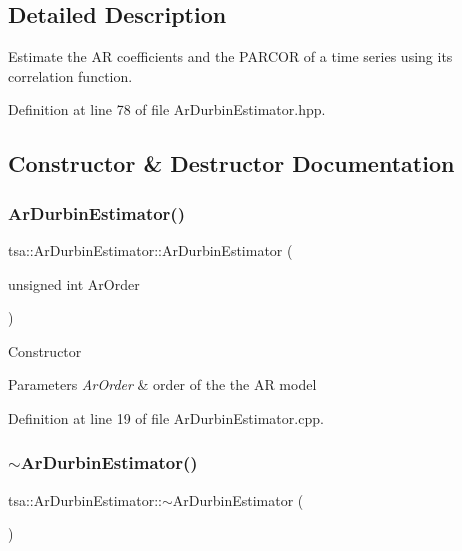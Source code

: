 \subsection{Detailed Description}
Estimate the AR coefficients and the P\+A\+R\+C\+OR of a time series using its correlation function. 

Definition at line 78 of file Ar\+Durbin\+Estimator.\+hpp.



\subsection{Constructor \& Destructor Documentation}
\mbox{\label{classtsa_1_1_ar_durbin_estimator_a2c79884f3aca03b9f6701c826dcbc07b}} 
\subsubsection{\texorpdfstring{Ar\+Durbin\+Estimator()}{ArDurbinEstimator()}}
{\footnotesize\ttfamily tsa\+::\+Ar\+Durbin\+Estimator\+::\+Ar\+Durbin\+Estimator (\begin{DoxyParamCaption}\item[{unsigned int}]{Ar\+Order }\end{DoxyParamCaption})}

Constructor


\begin{DoxyParams}{Parameters}
{\em Ar\+Order} & order of the the AR model \\
\hline
\end{DoxyParams}


Definition at line 19 of file Ar\+Durbin\+Estimator.\+cpp.

\mbox{\label{classtsa_1_1_ar_durbin_estimator_a19ed9832b8899ebf095d339952ee0f47}} 
\subsubsection{\texorpdfstring{$\sim$\+Ar\+Durbin\+Estimator()}{~ArDurbinEstimator()}}
{\footnotesize\ttfamily tsa\+::\+Ar\+Durbin\+Estimator\+::$\sim$\+Ar\+Durbin\+Estimator (\begin{DoxyParamCaption}{ }\end{DoxyParamCaption})}

